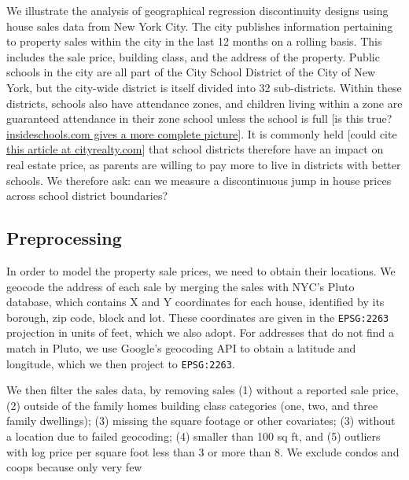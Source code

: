 \documentclass[letter]{article}
\begin{document}
We illustrate the analysis of geographical regression discontinuity designs using house sales data from New York City.
The city publishes information pertaining to property sales within the city in the last 12 months on a rolling basis.
This includes the sale price, building class, and the address of the property.
Public schools in the city are all part of the City School District of the City of New York, but the city-wide district is itself divided into 32 sub-districts.
Within these districts, schools also have attendance zones, and children living within a zone are guaranteed attendance in their zone school unless the school is full {[}is this true? \href{http://insideschools.org/elementary/how-to-apply}{insideschools.com gives a more complete picture}{]}.
It is commonly held {[}could cite \href{https://www.cityrealty.com/nyc/market-insight/features/trending-in-ny/buying-renting-school-zone-district-what-you-need-know/3661}{this article at cityrealty.com}{]} that school districts therefore have an impact on real estate price, as parents are willing to pay more to live in districts with better schools.
We therefore ask: can we measure a discontinuous jump in house prices across school district boundaries?
    


    	\subsection{Preprocessing}\label{preprocessing}

In order to model the property sale prices, we need to obtain their locations.
We geocode the address of each sale by merging the sales with NYC's Pluto database, which contains X and Y coordinates for each house, identified by its borough, zip code, block and lot.
These coordinates are given in the \texttt{EPSG:2263} projection in units of feet, which we also adopt.
For addresses that do not find a match in Pluto, we use Google's geocoding API to obtain a latitude and longitude, which we then project to \texttt{EPSG:2263}.

We then filter the sales data, by removing sales (1) without a reported sale price, (2) outside of the family homes building class categories (one, two, and three family dwellings); (3) missing the square footage or other covariates; (3) without a location due to failed geocoding; (4) smaller than 100 sq ft, and (5) outliers with log price per square foot less than 3 or more than 8.
We exclude condos and coops because only very few
\end{document}
